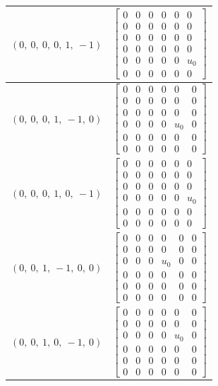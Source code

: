\documentclass[11pt]{article}
\theoremstyle{definition}
\begin{document}
\begin{longtable}{|l|c|}
    \hline
    $\left( 0, \  0, \  0, \  0, \  1, \  -1\right)$ & ${\left[\begin{matrix}0 & 0 & 0 & 0 & 0 & 0\\0 & 0 & 0 & 0 & 0 & 0\\0 & 0 & 0 & 0 & 0 & 0\\0 & 0 & 0 & 0 & 0 & 0\\0 & 0 & 0 & 0 & 0 & u_{0}\\0 & 0 & 0 & 0 & 0 & 0\end{matrix}\right]}$ \\
    \hline
    $\left( 0, \  0, \  0, \  1, \  -1, \  0\right)$ & ${\left[\begin{matrix}0 & 0 & 0 & 0 & 0 & 0\\0 & 0 & 0 & 0 & 0 & 0\\0 & 0 & 0 & 0 & 0 & 0\\0 & 0 & 0 & 0 & u_{0} & 0\\0 & 0 & 0 & 0 & 0 & 0\\0 & 0 & 0 & 0 & 0 & 0\end{matrix}\right]}$ \\
    \hline
    $\left( 0, \  0, \  0, \  1, \  0, \  -1\right)$ & ${\left[\begin{matrix}0 & 0 & 0 & 0 & 0 & 0\\0 & 0 & 0 & 0 & 0 & 0\\0 & 0 & 0 & 0 & 0 & 0\\0 & 0 & 0 & 0 & 0 & u_{0}\\0 & 0 & 0 & 0 & 0 & 0\\0 & 0 & 0 & 0 & 0 & 0\end{matrix}\right]}$ \\
    \hline
    $\left( 0, \  0, \  1, \  -1, \  0, \  0\right)$ & ${\left[\begin{matrix}0 & 0 & 0 & 0 & 0 & 0\\0 & 0 & 0 & 0 & 0 & 0\\0 & 0 & 0 & u_{0} & 0 & 0\\0 & 0 & 0 & 0 & 0 & 0\\0 & 0 & 0 & 0 & 0 & 0\\0 & 0 & 0 & 0 & 0 & 0\end{matrix}\right]}$ \\
    \hline
    $\left( 0, \  0, \  1, \  0, \  -1, \  0\right)$ & ${\left[\begin{matrix}0 & 0 & 0 & 0 & 0 & 0\\0 & 0 & 0 & 0 & 0 & 0\\0 & 0 & 0 & 0 & u_{0} & 0\\0 & 0 & 0 & 0 & 0 & 0\\0 & 0 & 0 & 0 & 0 & 0\\0 & 0 & 0 & 0 & 0 & 0\end{matrix}\right]}$ \\

\end{longtable}
\end{document}
